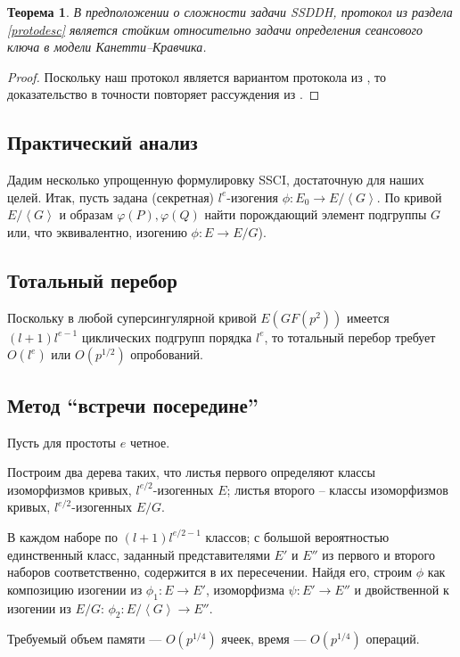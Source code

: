\documentclass[a4paper,12pt]{article}
\newcommand{\tr}[1]{\left\langle #1\right\rangle}
\newtheorem{theorem}{Теорема}
\theoremstyle{definition}
\begin{document}
\begin{theorem} В предположении о сложности задачи SSDDH, протокол из раздела \ref{protodesc} является стойким относительно задачи определения сеансового ключа в модели Канетти--Кравчика.
 \end{theorem}
\begin{proof}
 Поскольку наш протокол является вариантом протокола из \cite{DF}, то доказательство в точности повторяет рассуждения из \cite[Theorem 6.1]{DF}.
\end{proof}



\subsection{Практический анализ}

Дадим несколько упрощенную формулировку SSCI, достаточную для наших целей. Итак, пусть задана (секретная) $l^e$-изогения $\phi:E_0\to E/\tr{G}$. По кривой $E/\tr{G}$ и образам $\varphi (P), \varphi(Q)$
найти порождающий элемент  подгруппы $ G$ или, что эквивалентно, изогению $\phi:E\to E/G$).
 
 \subsection*{Тотальный перебор}
  
Поскольку в любой суперсингулярной кривой $E (GF(p^2))$ имеется $(l+1)l^{e-1}$ циклических подгрупп порядка $l^e$, то тотальный перебор требует $O(l^e) $ или $O(p^{1/2})$ опробований.
 
 \subsection*{Метод ``встречи посередине''}

 Пусть для простоты $e$ четное.
 
Построим два дерева таких, что листья первого определяют классы изоморфизмов кривых, $l^{e/2}$-изогенных $E$;
листья второго -- классы изоморфизмов кривых, $l^{e/2}$-изогенных $E/G$.

В каждом наборе по $(l+1)l^{e/2-1}$ классов; с большой вероятностью единственный класс, заданный представителями $E'$ и $E''$ из первого и второго наборов соответственно, содержится в их пересечении. Найдя его, строим 
$\phi$ как композицию изогении из $\phi_1:E\to E'$, изоморфизма $\psi:E'\to E''$ и двойственной к изогении из $E/G$: ${\phi}_2:E/\tr{G}\to E''$.

Требуемый объем памяти --- $O(p^{1/4})$ ячеек, время --- $O(p^{1/4})$ операций.
\end{document}
